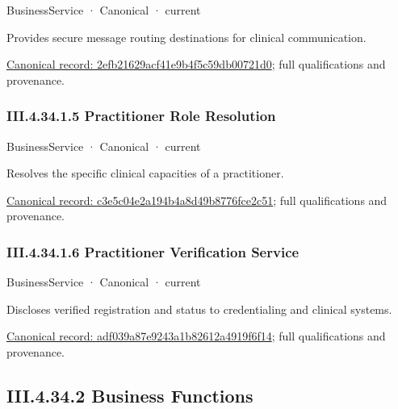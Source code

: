 \label{element:2efb21629acf41e9b4f5c59db00721d0}
{\small BusinessService · Canonical · current}\par

Provides secure message routing destinations for clinical communication.


{\footnotesize \href{../../../../continuum/business/business-service/2efb21629acf41e9b4f5c59db00721d0.md}{Canonical record: 2efb21629acf41e9b4f5c59db00721d0}; full qualifications and provenance.}\par
\subsubsection*{III.4.34.1.5 Practitioner Role Resolution}
\label{navigation:III.4.34.1.5}

\label{element:c3e5c04e2a194b4a8d49b8776fce2c51}
{\small BusinessService · Canonical · current}\par

Resolves the specific clinical capacities of a practitioner.


{\footnotesize \href{../../../../continuum/business/business-service/c3e5c04e2a194b4a8d49b8776fce2c51.md}{Canonical record: c3e5c04e2a194b4a8d49b8776fce2c51}; full qualifications and provenance.}\par
\subsubsection*{III.4.34.1.6 Practitioner Verification Service}
\label{navigation:III.4.34.1.6}

\label{element:adf039a87e9243a1b82612a4919f6f14}
{\small BusinessService · Canonical · current}\par

Discloses verified registration and status to credentialing and clinical systems.


{\footnotesize \href{../../../../continuum/business/business-service/adf039a87e9243a1b82612a4919f6f14.md}{Canonical record: adf039a87e9243a1b82612a4919f6f14}; full qualifications and provenance.}\par
\subsection*{III.4.34.2 Business Functions}
\label{navigation:III.4.34.2}

